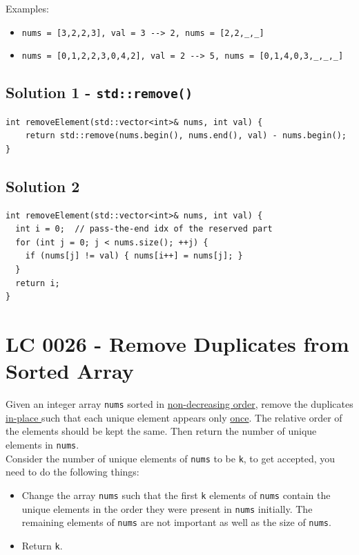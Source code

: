 Examples:
\begin{itemize}
	\item {\colorbox{CodeBackground}{\lstinline|nums = [3,2,2,3], val = 3 --> 2, nums = [2,2,_,_]|}}
	\item {\colorbox{CodeBackground}{\lstinline|nums = [0,1,2,2,3,0,4,2], val = 2 --> 5, nums = [0,1,4,0,3,_,_,_]|}}
\end{itemize}

\subsection*{Solution 1 - {\colorbox{CodeBackground}{\lstinline|std::remove()|}}}
\begin{lstlisting}
int removeElement(std::vector<int>& nums, int val) {
	return std::remove(nums.begin(), nums.end(), val) - nums.begin();
}
\end{lstlisting}

\subsection*{Solution 2}
\begin{lstlisting}
int removeElement(std::vector<int>& nums, int val) {
  int i = 0;  // pass-the-end idx of the reserved part
  for (int j = 0; j < nums.size(); ++j) {
    if (nums[j] != val) { nums[i++] = nums[j]; }
  }
  return i;
}
\end{lstlisting}

\section{LC 0026 - Remove Duplicates from Sorted Array}\label{lc0026}
Given an integer array {\colorbox{CodeBackground}{\lstinline|nums|}} sorted in \ul{non-decreasing order}, remove the duplicates \ul{in-place }such that each unique element appears only \ul{once}. The relative order of the elements should be kept the same. Then return the number of unique elements in {\colorbox{CodeBackground}{\lstinline|nums|}}.\\

Consider the number of unique elements of {\colorbox{CodeBackground}{\lstinline|nums|}} to be {\colorbox{CodeBackground}{\lstinline|k|}}, to get accepted, you need to do the following things:
\begin{itemize}
	\item Change the array {\colorbox{CodeBackground}{\lstinline|nums|}} such that the first {\colorbox{CodeBackground}{\lstinline|k|}} elements of {\colorbox{CodeBackground}{\lstinline|nums|}} contain the unique elements in the order they were present in {\colorbox{CodeBackground}{\lstinline|nums|}} initially. The remaining elements of {\colorbox{CodeBackground}{\lstinline|nums|}} are not important as well as the size of {\colorbox{CodeBackground}{\lstinline|nums|}}.
	\item Return {\colorbox{CodeBackground}{\lstinline|k|}}.
\end{itemize}

